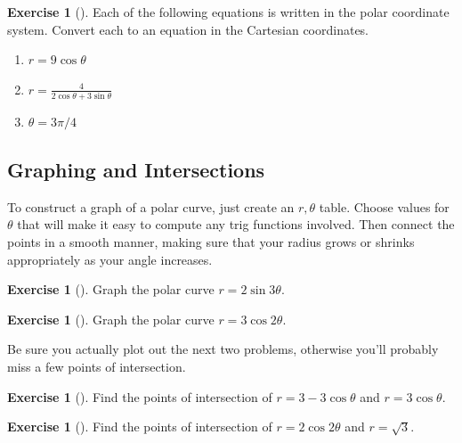\documentclass[10pt,]{book}
\theoremstyle{plain}
\theoremstyle{definition}
\theoremstyle{definition}
\theoremstyle{definition}
\theoremstyle{definition}
\newtheorem{exploration}[project]{Exercise}
\theoremstyle{definition}
\numberwithin{equation}{section}
\newcommand{\ds}{\displaystyle}
\begin{document}
\begin{exploration}[]\label{exploration-90}
Each of the following equations is written in the polar coordinate system. Convert each to an equation in the Cartesian coordinates.%
\begin{enumerate}[font=\bfseries,label=(\alph*),ref=\alph*]
\item\label{task-152} \(r=9\cos\theta\)%
\item\label{task-153} \(\ds r=\frac{4}{2\cos\theta+3\sin\theta}\)%
\item\label{task-154} \(\theta = 3\pi/4\)%
\end{enumerate}
\end{exploration}
\typeout{************************************************}
\typeout{************************************************}
\subsection[{Graphing and Intersections}]{Graphing and Intersections}\label{subsection-20}
To construct a graph of a polar curve, just create an \(r,\theta\) table. Choose values for \(\theta\) that will make it easy to compute any trig functions involved. Then connect the points in a smooth manner, making sure that your radius grows or shrinks appropriately as your angle increases.%
\begin{exploration}[]\label{exploration-91}
Graph the polar curve \(r=2\sin 3\theta\).%
\end{exploration}
\begin{exploration}[]\label{exploration-92}
Graph the polar curve \(r=3\cos 2\theta\).%
\end{exploration}
Be sure you actually plot out the next two problems, otherwise you'll probably miss a few points of intersection.%
\begin{exploration}[]\label{exploration-93}
Find the points of intersection of \(r=3-3\cos\theta\) and \(r=3\cos\theta\).%
\end{exploration}
\begin{exploration}[]\label{exploration-94}
Find the points of intersection of \(r=2\cos 2\theta\) and \(r=\sqrt 3\).%
\end{exploration}
\typeout{************************************************}
\typeout{************************************************}
\end{document}
